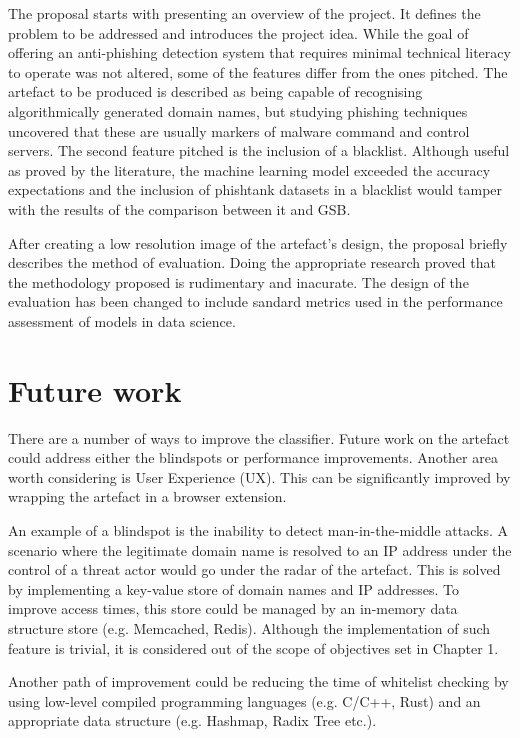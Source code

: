 The proposal starts with presenting an overview of the project. It defines the problem to be addressed and introduces the project idea. While the goal of offering an anti-phishing detection system that requires minimal technical literacy to operate was not altered, some of the features differ from the ones pitched. The artefact to be produced is described as being capable of recognising algorithmically generated domain names, but studying phishing techniques uncovered that these are usually markers of malware command and control servers. The second feature pitched is the inclusion of a blacklist. Although useful as proved by the literature, the machine learning model exceeded the accuracy expectations and the inclusion of phishtank datasets in a blacklist would tamper with the results of the comparison between it and GSB.

After creating a low resolution image of the artefact's design, the proposal briefly describes the method of evaluation. Doing the appropriate research proved that the methodology proposed is rudimentary and inacurate. The design of the evaluation has been changed to include sandard metrics used in the performance assessment of models in data science.

\section{Future work}
There are a number of ways to improve the classifier. Future work on the artefact could address either the blindspots or performance improvements. Another area worth considering is User Experience (UX). This can be significantly improved by wrapping the artefact in a browser extension.

An example of a blindspot is the inability to detect man-in-the-middle attacks. A scenario where the legitimate domain name is resolved to an IP address under the control of a threat actor would go under the radar of the artefact. This is solved by implementing a key-value store of domain names and IP addresses. To improve access times, this store could be managed by an in-memory data structure store (e.g. Memcached, Redis). Although the implementation of such feature is trivial, it is considered out of the scope of objectives set in Chapter 1.

Another path of improvement could be reducing the time of whitelist checking by using low-level compiled programming languages (e.g. C/C++, Rust) and an appropriate data structure (e.g. Hashmap, Radix Tree etc.). 

